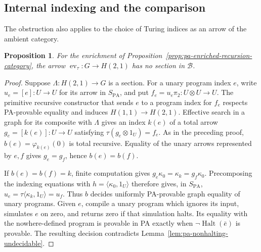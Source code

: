 \documentclass[11pt]{article}
\newtheorem{proposition}[theorem]{Proposition}
\theoremstyle{definition}
\theoremstyle{remark}
\begin{document}
\subsection{Internal indexing and the comparison}

The obstruction also applies to the choice of Turing indices
as an arrow of the ambient category.

\begin{proposition}\label{prop:pa-no-internal-indexing}
For the enrichment of
Proposition~\ref{prop:pa-enriched-recursion-category}, the arrow
$\operatorname{ev}_\tau:G\to H(2,1)$ has no section in
$\mathcal B$.
\end{proposition}
\begin{proof}
Suppose $\Lambda:H(2,1)\to G$ is a section.
For a unary program index $e$, write $u_e=[e]:U\to U$ for
its arrow in $S_{\mathrm{PA}}$, and put
$f_e=u_e\pi_2:U\otimes U\to U$.
The primitive recursive constructor that sends $e$ to a program
index for $f_e$ respects PA-provable equality and induces
$H(1,1)\to H(2,1)$.
Effective search in a graph for its composite with $\Lambda$
gives an index $k(e)$ of a total arrow $g_e=[k(e)]:U\to U$ satisfying
$\tau(g_e\otimes1_U)=f_e$.
As in the preceding proof, $b(e)=\varphi_{k(e)}(0)$ is total recursive.
Equality of the unary arrows represented by $e,f$ gives
$g_e=g_f$, hence $b(e)=b(f)$.

If $b(e)=b(f)=k$, finite computation gives
$g_e\kappa_0=\kappa_k=g_f\kappa_0$.
Precomposing the indexing equations with
$h=\langle\kappa_0,1_U\rangle$ therefore gives, in
$S_{\mathrm{PA}}$,
$u_e=\tau\langle\kappa_k,1_U\rangle=u_f$.
Thus $b$ decides uniformly PA-provable graph equality of unary
programs. Given $e$, compile a unary program which ignores its
input, simulates $e$ on zero, and returns zero if that simulation
halts. Its equality with the nowhere-defined program is provable
in PA exactly when $\neg\operatorname{Halt}(\bar e)$ is provable.
The resulting decision contradicts
Lemma~\ref{lem:pa-nonhalting-undecidable}.
\end{proof}
\end{document}
